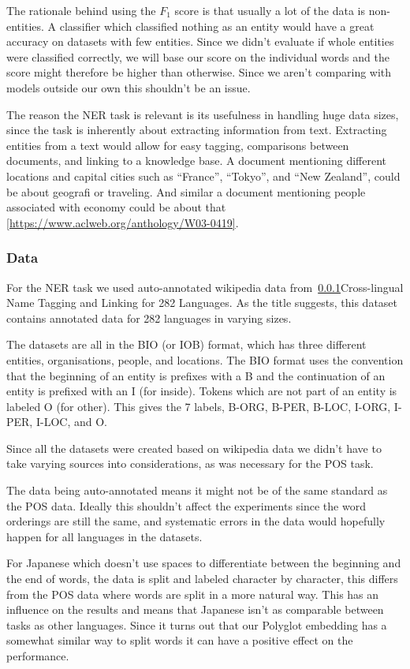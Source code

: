 The rationale behind using the $F_1$ score is that usually a lot of the data is
non-entities. A classifier which classified nothing as an entity would have a
great accuracy on datasets with few entities. Since we didn't evaluate if whole
entities were classified correctly, we will base our score on the individual
words and the score might therefore be higher than otherwise. Since we aren't
comparing with models outside our own this shouldn't be an issue.

The reason the NER task is relevant is its usefulness in handling huge data
sizes, since the task is inherently about extracting information from text.
Extracting entities from a text would allow for easy tagging, comparisons
between documents, and linking to a knowledge base. A document mentioning
different locations and capital cities such as ``France'', ``Tokyo'', and ``New
Zealand'', could be about geografi or traveling. And similar a document
mentioning people associated with economy could be about that
\ref{https://www.aclweb.org/anthology/W03-0419}. 


\subsubsection{Data}

For the NER task we used auto-annotated wikipedia data from~\ref{}{Cross-lingual
Name Tagging and Linking for 282 Languages}. As the title suggests, this dataset
contains annotated data for 282 languages in varying sizes. 

The datasets are all in the BIO (or IOB) format, which has three different
entities, organisations, people, and locations. The BIO format uses the
convention that the beginning of an entity is prefixes with a B and the
continuation of an entity is prefixed with an I (for inside). Tokens which are
not part of an entity is labeled O (for other). This gives the 7 labels, B-ORG,
B-PER, B-LOC, I-ORG, I-PER, I-LOC, and O. 

Since all the datasets were created based on wikipedia data we didn't have to
take varying sources into considerations, as was necessary for the POS task.

The data being auto-annotated means it might not be of the same standard as the
POS data. Ideally this shouldn't affect the experiments since the word orderings
are still the same, and systematic errors in the data would hopefully happen for
all languages in the datasets.

For Japanese which doesn't use spaces to differentiate between the beginning and
the end of words, the data is split and labeled character by character, this
differs from the POS data where words are split in a more natural way. This has
an influence on the results and means that Japanese isn't as comparable between
tasks as other languages. Since it turns out that our Polyglot embedding has a
somewhat similar way to split words it can have a positive effect on the
performance.

